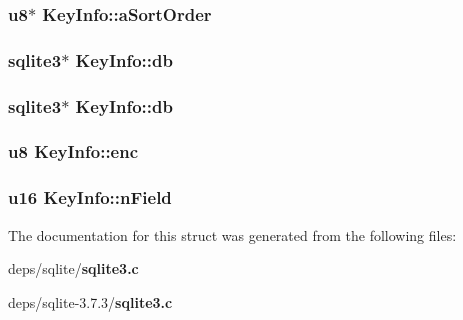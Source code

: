 \subsubsection{\setlength{\rightskip}{0pt plus 5cm}\bf{u8}$\ast$ \bf{Key\-Info::a\-Sort\-Order}}\label{structKeyInfo_3282b3c9dfe1f3ee3736285874a3a0e1}


\subsubsection{\setlength{\rightskip}{0pt plus 5cm}\bf{sqlite3}$\ast$ \bf{Key\-Info::db}}\label{structKeyInfo_6dd51bb6b81c915b7d8ec2050952c221}


\subsubsection{\setlength{\rightskip}{0pt plus 5cm}\bf{sqlite3}$\ast$ \bf{Key\-Info::db}}\label{structKeyInfo_6dd51bb6b81c915b7d8ec2050952c221}


\subsubsection{\setlength{\rightskip}{0pt plus 5cm}\bf{u8} \bf{Key\-Info::enc}}\label{structKeyInfo_0ba611f3a49a8836bc8286e3cabefe9b}


\subsubsection{\setlength{\rightskip}{0pt plus 5cm}\bf{u16} \bf{Key\-Info::n\-Field}}\label{structKeyInfo_b747309685ab7e0931979cc2ea2e9c3c}




The documentation for this struct was generated from the following files:\begin{CompactItemize}
\item 
deps/sqlite/\bf{sqlite3.c}\item 
deps/sqlite-3.7.3/\bf{sqlite3.c}\end{CompactItemize}

